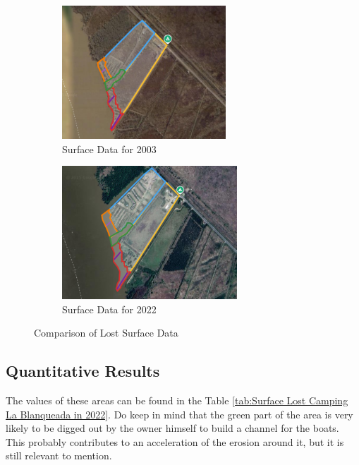 \begin{figure}[H]
    \centering
    \begin{subfigure}[b]{0.45\textwidth} %
        \includegraphics[width=\linewidth, height=5cm]{figures/appendix-g/delen2003.png}
        \caption{Surface Data for 2003}
        \label{fig:surface2003.1}
    \end{subfigure}
    \hfill
    \begin{subfigure}[b]{0.45\textwidth} %
        \includegraphics[width=\linewidth, height=5cm]{figures/appendix-g/delen2022.png}
        \caption{Surface Data for 2022}
        \label{fig:surface2022.1}
    \end{subfigure}
    \caption{Comparison of Lost Surface Data}
    \label{fig:surfacelost_comparison}
\end{figure}


\subsection{Quantitative Results}
\label{section:quantitative_results}

The values of these areas can be found in the Table \ref{tab:Surface Lost Camping La Blanqueada in 2022}.
Do keep in mind that the green part of the area is very likely to be digged out by the owner himself to build a channel for the boats. This probably contributes to an acceleration of the erosion around it, but it is still relevant to mention.

